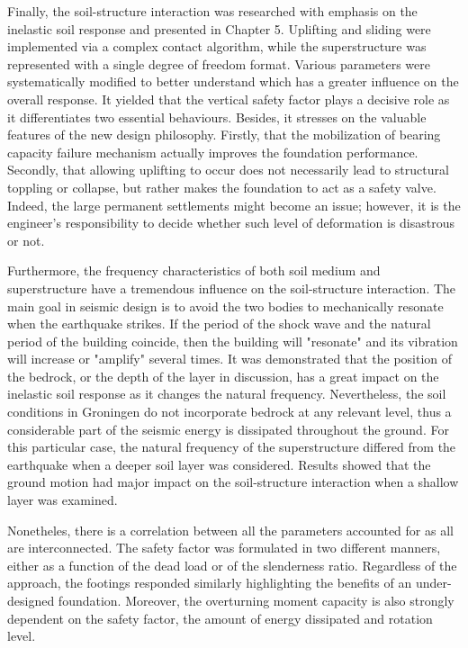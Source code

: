  Finally, the soil-structure interaction was researched with emphasis on the inelastic soil response and presented in Chapter 5. Uplifting and sliding were implemented via a complex contact algorithm, while the superstructure was represented with a single degree of freedom format. Various parameters were systematically modified to better understand which has a greater influence on the overall response. It yielded that the vertical safety factor plays a decisive role as it differentiates two essential behaviours. Besides, it stresses on the valuable features of the new design philosophy. Firstly, that the mobilization of bearing capacity failure mechanism actually improves the foundation performance. Secondly, that allowing uplifting to occur does not necessarily lead to structural toppling or collapse, but rather makes the foundation to act as a safety valve. Indeed, the large permanent settlements might become an issue; however, it is the engineer's responsibility to decide whether such level of deformation is disastrous or not. 
 
 Furthermore, the frequency characteristics of both soil medium and superstructure have a tremendous influence on the soil-structure interaction. The main goal in seismic design is to avoid the two bodies to mechanically resonate when the earthquake strikes. If the period of the shock wave and the natural period of the building coincide, then the building will "resonate" and its vibration will increase or "amplify" several times. It was demonstrated that the position of the bedrock, or the depth of the layer in discussion, has a great impact on the inelastic soil response as it changes the natural frequency. Nevertheless, the soil conditions in Groningen do not incorporate bedrock at any relevant level, thus a considerable part of the seismic energy is dissipated throughout the ground. For this particular case, the natural frequency of the superstructure differed from the earthquake when a deeper soil layer was considered. Results showed that the ground motion had major impact on the soil-structure interaction when a shallow layer was examined. 
 
 Nonetheles, there is a correlation between all the parameters accounted for as all are interconnected. The safety factor was formulated in two different manners, either as a function of the dead load or of the slenderness ratio. Regardless of the approach, the footings responded similarly highlighting the benefits of an under-designed foundation. Moreover, the overturning moment capacity is also strongly dependent on the safety factor, the amount of energy dissipated and rotation level. 
 

